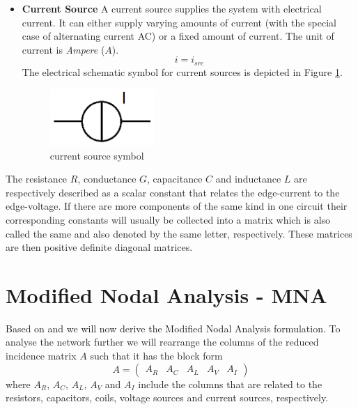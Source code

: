 \begin{itemize}
	\item \textbf{Current Source} \newline
	A current source supplies the system with electrical current. It can either supply varying amounts of current (with the special case of alternating current AC) or a fixed amount of current. The unit of current is \emph{Ampere} ($A$).
	\begin{equation}
		\label{eq:current source law}
		i = i_{src}
	\end{equation}
	The electrical schematic symbol for current sources is depicted in Figure \ref{fig:current source symbol}.
	\begin{figure}[H]
		\centering
		\includegraphics[width=4cm]{pictures/current_source.png}
		\caption{current source symbol}
		\label{fig:current source symbol}
	\end{figure}
\end{itemize}

The resistance $R$, conductance $G$, capacitance $C$ and inductance $L$ are respectively described as a scalar constant that relates the edge-current to the edge-voltage. If there are more components of the same kind in one circuit their corresponding constants will usually be collected into a matrix which is also called the same and also denoted by the same letter, respectively. These matrices are then positive definite diagonal matrices.

\section{Modified Nodal Analysis - MNA}
\label{sec:MNA}

Based on \cite{ModellingAndDiscretizationOfCircuitProblems} and \cite{NumerikGewöhnlicherDifferentialgleichungen} we will now derive the Modified Nodal Analysis formulation. To analyse the network further we will rearrange the columns of the reduced incidence matrix $A$ such that it has the block form
\begin{displaymath}
	A = 
	\begin{pmatrix}
		A_R & A_C & A_L & A_V & A_I
	\end{pmatrix}
\end{displaymath}
where $A_R$, $A_C$, $A_L$, $A_V$ and $A_I$ include the columns that are related to the resistors, capacitors, coils, voltage sources and current sources, respectively.

